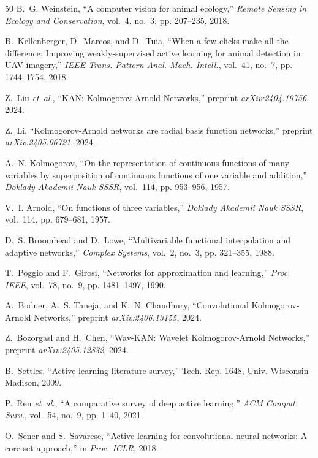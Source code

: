 \documentclass[conference]{IEEEtran}
\begin{document}
\begin{thebibliography}{50}
B.~G. Weinstein, ``A computer vision for animal ecology,'' \emph{Remote Sensing in Ecology and Conservation}, vol.~4, no.~3, pp. 207--235, 2018.

B.~Kellenberger, D.~Marcos, and D.~Tuia, ``When a few clicks make all the difference: Improving weakly-supervised active learning for animal detection in UAV imagery,'' \emph{IEEE Trans. Pattern Anal. Mach. Intell.}, vol.~41, no.~7, pp. 1744--1754, 2018.

Z.~Liu \emph{et~al.}, ``KAN: Kolmogorov-Arnold Networks,'' preprint \emph{arXiv:2404.19756}, 2024.

Z.~Li, ``Kolmogorov-Arnold networks are radial basis function networks,'' preprint \emph{arXiv:2405.06721}, 2024.

A.~N. Kolmogorov, ``On the representation of continuous functions of many variables by superposition of continuous functions of one variable and addition,'' \emph{Doklady Akademii Nauk SSSR}, vol.~114, pp. 953--956, 1957.

V.~I. Arnold, ``On functions of three variables,'' \emph{Doklady Akademii Nauk SSSR}, vol.~114, pp. 679--681, 1957.

D.~S. Broomhead and D.~Lowe, ``Multivariable functional interpolation and adaptive networks,'' \emph{Complex Systems}, vol.~2, no.~3, pp. 321--355, 1988.

T.~Poggio and F.~Girosi, ``Networks for approximation and learning,'' \emph{Proc. IEEE}, vol.~78, no.~9, pp. 1481--1497, 1990.

A.~Bodner, A.~S. Taneja, and K.~N. Chaudhury, ``Convolutional Kolmogorov-Arnold Networks,'' preprint \emph{arXiv:2406.13155}, 2024.

Z.~Bozorgasl and H.~Chen, ``Wav-KAN: Wavelet Kolmogorov-Arnold Networks,'' preprint \emph{arXiv:2405.12832}, 2024.

B.~Settles, ``Active learning literature survey,'' Tech. Rep. 1648, Univ. Wisconsin--Madison, 2009.

P.~Ren \emph{et~al.}, ``A comparative survey of deep active learning,'' \emph{ACM Comput. Surv.}, vol.~54, no.~9, pp. 1--40, 2021.

O.~Sener and S.~Savarese, ``Active learning for convolutional neural networks: A core-set approach,'' in \emph{Proc. ICLR}, 2018.


\end{thebibliography}
\end{document}
